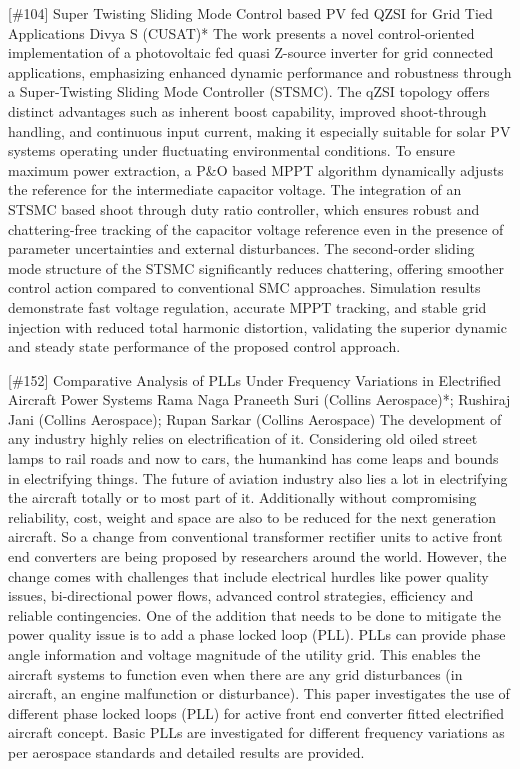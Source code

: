 {} \begin{abstract_online} {[\#104] Super Twisting Sliding Mode Control based PV fed  QZSI for Grid Tied Applications} {} {Divya  S (CUSAT)*} {} The work presents a novel control-oriented implementation of a photovoltaic fed quasi Z-source inverter for grid connected applications, emphasizing enhanced dynamic performance and robustness through a Super-Twisting Sliding Mode Controller (STSMC). The qZSI topology offers distinct advantages such as inherent boost capability, improved shoot-through handling, and continuous input current, making it especially suitable for solar PV systems operating under fluctuating environmental conditions. To ensure maximum power extraction, a P\&O based MPPT algorithm dynamically adjusts the reference for the intermediate capacitor voltage. The integration of an STSMC based shoot through duty ratio controller, which ensures robust and chattering-free tracking of the capacitor voltage reference even in the presence of parameter uncertainties and external disturbances. The second-order sliding mode structure of the STSMC significantly reduces chattering, offering smoother control action compared to conventional SMC approaches. Simulation results demonstrate fast voltage regulation, accurate MPPT tracking, and stable grid injection with reduced total harmonic distortion, validating the superior dynamic and steady state performance of the proposed control approach. \end{abstract_online} 
{} \begin{abstract_online} {[\#152] Comparative Analysis of PLLs Under Frequency Variations in Electrified Aircraft Power Systems} {} {Rama Naga Praneeth Suri (Collins Aerospace)*; Rushiraj Jani (Collins Aerospace); Rupan Sarkar (Collins Aerospace)} {} The development of any industry highly relies on electrification of it. Considering old oiled street lamps to rail roads and now to cars, the humankind has come leaps and bounds in electrifying things. The future of aviation industry also lies a lot in electrifying the aircraft totally or to most part of it. Additionally without compromising reliability, cost, weight and space are also to be reduced for the next generation aircraft. So a change from conventional transformer rectifier units to active front end converters are being proposed by researchers around the world. However, the change comes with challenges that include electrical hurdles like power quality issues, bi-directional power flows, advanced control strategies, efficiency and reliable contingencies. One of the addition that needs to be done to mitigate the power quality issue is to add a phase locked loop (PLL). PLLs can provide phase angle information and voltage magnitude of the utility grid. This enables the aircraft systems to function even when there are any grid disturbances (in aircraft, an engine malfunction or disturbance). This paper investigates the use of different phase locked loops (PLL) for active front end converter fitted electrified aircraft concept. Basic PLLs are investigated for different frequency variations as per aerospace standards and detailed results are provided.   \end{abstract_online} 
